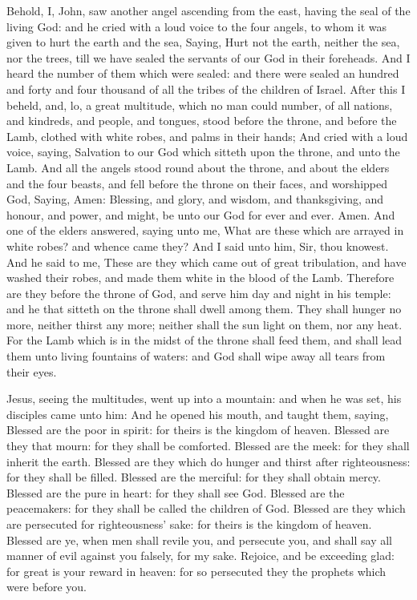  Behold, I, John, saw another angel ascending from the east, having the seal of the living God: and he cried with a loud voice to the four angels, to whom it was given to hurt the earth and the sea, Saying, Hurt not the earth, neither the sea, nor the trees, till we have sealed the servants of our God in their foreheads. And I heard the number of them which were sealed: and there were sealed an hundred and forty and four thousand of all the tribes of the children of Israel. After this I beheld, and, lo, a great multitude, which no man could number, of all nations, and kindreds, and people, and tongues, stood before the throne, and before the Lamb, clothed with white robes, and palms in their hands; And cried with a loud voice, saying, Salvation to our God which sitteth upon the throne, and unto the Lamb. And all the angels stood round about the throne, and about the elders and the four beasts, and fell before the throne on their faces, and worshipped God, Saying, Amen: Blessing, and glory, and wisdom, and thanksgiving, and honour, and power, and might, be unto our God for ever and ever. Amen. And one of the elders answered, saying unto me, What are these which are arrayed in white robes? and whence came they? And I said unto him, Sir, thou knowest. And he said to me, These are they which came out of great tribulation, and have washed their robes, and made them white in the blood of the Lamb. Therefore are they before the throne of God, and serve him day and night in his temple: and he that sitteth on the throne shall dwell among them. They shall hunger no more, neither thirst any more; neither shall the sun light on them, nor any heat. For the Lamb which is in the midst of the throne shall feed them, and shall lead them unto living fountains of waters: and God shall wipe away all tears from their eyes.


 Jesus, seeing the multitudes, went up into a mountain: and when he was set, his disciples came unto him: And he opened his mouth, and taught them, saying, Blessed are the poor in spirit: for theirs is the kingdom of heaven. Blessed are they that mourn: for they shall be comforted. Blessed are the meek: for they shall inherit the earth. Blessed are they which do hunger and thirst after righteousness: for they shall be filled. Blessed are the merciful: for they shall obtain mercy. Blessed are the pure in heart: for they shall see God. Blessed are the peacemakers: for they shall be called the children of God. Blessed are they which are persecuted for righteousness' sake: for theirs is the kingdom of heaven. Blessed are ye, when men shall revile you, and persecute you, and shall say all manner of evil against you falsely, for my sake. Rejoice, and be exceeding glad: for great is your reward in heaven: for so persecuted they the prophets which were before you.

